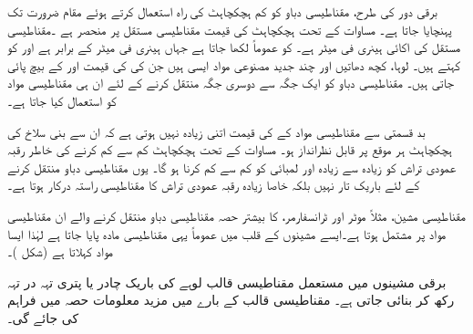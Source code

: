برقی دور کی طرح، مقناطیسی دباو کو کم ہچکچاہٹ کی راہ استعمال کرتے ہوئے مقام ضرورت تک پہنچایا جاتا ہے۔ مساوات    کے تحت  ہچکچاہٹ کی قیمت  مقناطیسی مستقل  پر منحصر ہے ۔مقناطیسی مستقل کی اکائی   ہینری فی میٹر  ہے۔ کو عموماً  لکھا جاتا ہے جہاں   ہینری فی میٹر کے برابر ہے اور  کو  کہتے ہیں۔ لوہا،  کچھ دھاتیں اور چند جدید مصنوعی مواد  ایسی ہیں جن کی  کی قیمت  اور  کے  بیچ پائی جاتی ہیں۔ مقناطیسی دباو کو  ایک جگہ سے دوسری جگہ منتقل کرنے کے لئے ان ہی مقناطیسی مواد کو  استعمال کیا جاتا ہے۔

 بد قسمتی سے  مقناطیسی مواد کے   کی قیمت اتنی زیادہ  نہیں ہوتی ہے کہ ان سے بنی سلاخ کی ہچکچاہٹ ہر موقع پر قابل نظرانداز ہو۔ مساوات   کے تحت  ہچکچاہٹ کم سے کم کرنے کی خاطر رقبہ عمودی تراش کو زیادہ سے زیادہ اور لمبائی کو کم سے کم  کرنا ہو گا۔ یوں مقناطیسی دباو منتقل کرنے کے لئے  باریک تار نہیں بلکہ خاصا زیادہ رقبہ عمودی تراش کا مقناطیسی راستہ  درکار ہوتا ہے۔

مقناطیسی مشین، مثلاً موٹر اور ٹرانسفارمر، کا بیشتر حصہ مقناطیسی دباو منتقل کرنے والے ان مقناطیسی مواد  پر مشتمل ہوتا ہے۔ایسے مشینوں کے قلب میں عموماً یہی مقناطیسی مادہ پایا جاتا ہے لہٰذا ایسا مواد   کہلاتا ہے (شکل )۔

برقی مشینوں میں مستعمل  مقناطیسی قالب لوہے کی باریک چادر یا پتری  تہہ  در تہہ رکھ کر بنائی جاتی ہے۔ مقناطیسی قالب کے بارے میں مزید معلومات حصہ   میں  فراہم کی جائے گی۔

